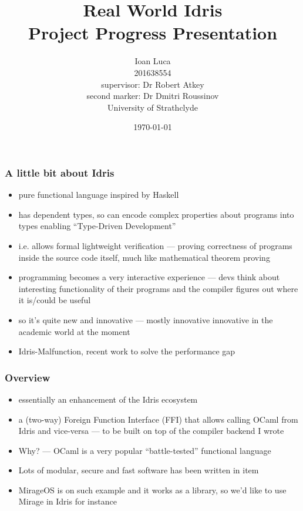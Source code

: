 \documentclass{beamer}
\title{Real World Idris \\ Project Progress Presentation}
\author{Ioan Luca \\ 201638554 \\ \small supervisor: Dr Robert Atkey \\
	\small second marker: Dr Dmitri Roussinov \\
	\small University of Strathclyde} %
\date{\today}
\begin{document}
\frame{\titlepage}


\begin{frame}
	\frametitle{A little bit about Idris}
	\begin{itemize}
		\item pure functional language inspired by Haskell
		\item has dependent types, so can encode complex properties
		      about programs into types enabling ``Type-Driven Development''
		\item i.e. allows formal lightweight verification --- proving
		      correctness of programs inside the source code itself,
		      much like mathematical theorem proving
		\item programming becomes a very interactive experience
		      --- devs think about interesting functionality of their programs
		      and the compiler figures out where it is/could be useful
		\item so it's quite new and innovative --- mostly innovative innovative
		      in the academic world at the moment
		\item Idris-Malfunction, recent work to solve the performance gap
	\end{itemize}
\end{frame}


\begin{frame}
	\frametitle{Overview}

	\begin{itemize}
		\item essentially an enhancement of the Idris ecosystem
		\item a (two-way) Foreign Function Interface (FFI) that
		      allows calling OCaml
		      from Idris and vice-versa --- to be built on top of the
		      compiler backend I wrote
		\item Why? --- OCaml is a very popular ``battle-tested'' 
			  functional language
	    \item Lots of modular, secure and fast software has been written in item
	    \item MirageOS is on such example and it works as a library, so we'd 
		      like to use Mirage in Idris for instance
	\end{itemize}
\end{frame}


\begin{frame}

\end{frame}
\end{document}
